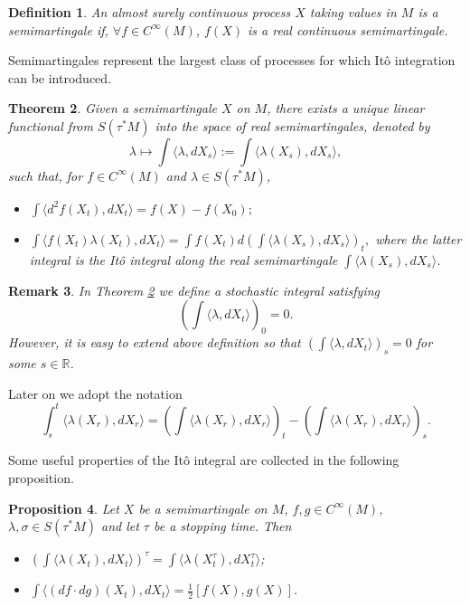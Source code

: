 \documentclass{article}[10pt]
\newtheorem{theorem}{Theorem}[section]
\newtheorem{definition}[theorem]{Definition}
\newtheorem{proposition}[theorem]{Proposition}
\newtheorem{remark}[theorem]{Remark}
\newcommand{\cinf}[0]{C^{\infty}}
\begin{document}
\begin{definition}
An almost surely continuous process $X$ taking values in $ M $  is
a \emph{semimartingale} if, $ \forall f \in \cinf (M) $, $ f
(X) $ is a real continuous semimartingale.
\end{definition}
Semimartingales represent the largest class of processes for which It\^o integration can be introduced.
\begin{theorem}\label{theorem_semimartingale3}
Given a  semimartingale $ X $ on $ M $, there exists a
unique linear functional from $ S (\tau ^ * M) $  into the space
of real semimartingales, denoted by
$$\lambda \longmapsto  \int{\langle \lambda,dX_s\rangle}:=\int {\langle \lambda(X_s), dX_s \rangle },$$
such that, for $f \in \cinf(M)$ and $\lambda \in S(\tau^*M)$,
\begin{itemize}
\item $\int{\langle d^2f(X_t),dX_t\rangle}=f(X)-f(X_0);$
\item  $\int{\langle f(X_t) \lambda(X_t),dX_t\rangle}=\int{f(X_t)d\left(\int{\langle \lambda(X_s),dX_s\rangle}\right)_t},$
where the latter integral is the It\^o integral along the real semimartingale $ \int {\langle \lambda (X_s), dX_s \rangle} $.
\end{itemize}
\end{theorem}

\begin{remark}\label{remark_s}
In  Theorem \ref{theorem_semimartingale3} we define a  stochastic integral satisfying 
$$ \left(\int{\langle \lambda, dX_t \rangle} \right)_0=0.$$
However, it is easy  to extend above definition so  that $\left(\int{\langle \lambda, dX_t \rangle }\right)_s=0$ for some $s \in \mathbb{R}$.
\end{remark}

Later on we adopt the notation
$$\int_s^t{\langle \lambda(X_r), dX_r \rangle}=\left(\int{\langle \lambda(X_r), dX_r \rangle }\right)_t-\left(\int{\langle \lambda(X_r), dX_r \rangle} \right)_s.$$

Some useful properties of the  It\^o integral are collected  in the following proposition.

\begin{proposition}\label{proposition_semimartingale2}
Let $X$ be a semimartingale on $M$, $f,g \in
\cinf(M)$, $\lambda,\sigma \in S(\tau^* M)$ and let $\tau$ be a
stopping time. Then
\begin{itemize}
\item $\left(\int\langle \lambda(X_t),dX_t\rangle\right)^{\tau}=\int{\langle    \lambda(X_t^ {\tau}) ,dX_t^{\tau}\rangle}$;
\item $\int{\langle (df \cdot dg)(X_t),dX_t\rangle}=\frac{1}{2}[f(X),g(X)]$.
\end{itemize}
\end{proposition}
\end{document}
